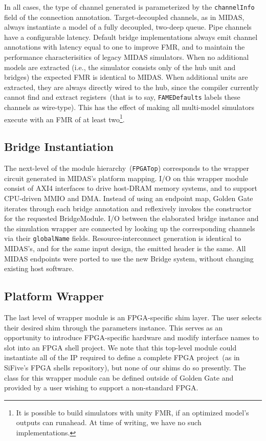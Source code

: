 In all cases, the type of channel generated is parameterized by the
\texttt{channelInfo} field of the connection annotation. Target-decoupled channels, as in
MIDAS, always instantiate a model of a fully decoupled, two-deep queue. Pipe
channels have a configurable latency. Default bridge implementations always
emit channel annotations with latency equal to one to improve FMR, and to maintain the
performance characterisitics of legacy MIDAS simulators. When no additional
models are extracted (i.e., the simulator consists only of the hub unit and
bridges) the expected FMR is identical to MIDAS.
When additional units are extracted, they are always directly wired to the
hub, since the compiler currently cannot find and extract registers~(that is to
say, \texttt{FAMEDefaults} labels these channels as wire-type). This has
the effect of making all multi-model simulators execute with an FMR of at least two\footnote{It is possible to build
simulators with unity FMR, if an optimized model's outputs can runahead. At time
of writing, we have no such implementations.}.

\subsection{Bridge Instantiation}
The next-level of the module hierarchy~(\texttt{FPGATop}) corresponds to the wrapper
circuit generated in MIDAS's platform mapping. I/O on this wrapper module consist of AXI4 interfaces
to drive host-DRAM memory systems, and to support CPU-driven MMIO and DMA.
Instead of using an endpoint map, Golden Gate iterates through each bridge
annotation and reflexively invokes the constructor for the requested
BridgeModule. I/O between the elaborated
bridge instance and the simulation wrapper are connected by looking up the
corresponding channels via their \texttt{globalName} fields.
Resource-interconnect generation is identical to MIDAS's, and for the same
input design, the emitted header is the same. All MIDAS endpoints were ported
to use the new Bridge system, without changing existing host software.

\subsection{Platform Wrapper}
The last level of wrapper module is an FPGA-specific shim layer. The user
selects their desired shim through the parameters instance. This serves as an
opportunity to introduce FPGA-specific hardware and modify interface names to
slot into an FPGA shell project. We note that this top-level module could
instantiate all of the IP required to define a complete FPGA project~(as in
SiFive's FPGA shells repository), but none of our shims do so presently. The
class for this wrapper module can be defined outside of Golden Gate and
provided by a user wishing to support a non-standard FPGA.

